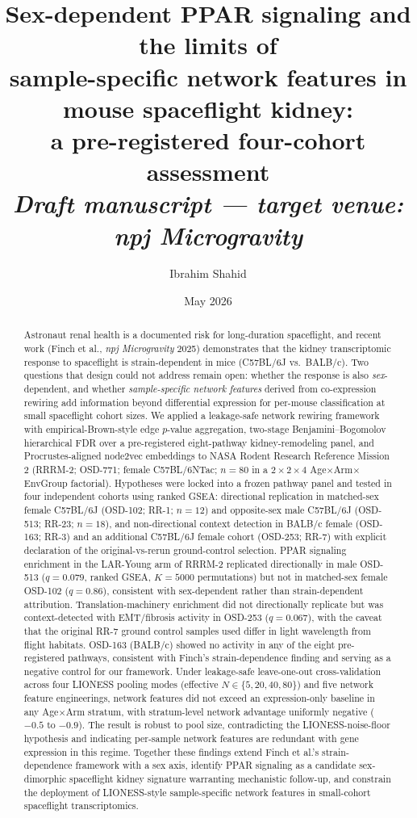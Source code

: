 \documentclass[11pt]{article}
\title{\textbf{Sex-dependent PPAR signaling and the limits of \\
sample-specific network features in mouse spaceflight kidney: \\
a pre-registered four-cohort assessment} \\[0.4em]
\large \textit{Draft manuscript --- target venue: \textnormal{npj Microgravity}}}
\author[1]{Ibrahim Shahid}
\author[1,*]{}
\affil[1]{Independent research; manuscript in preparation}
\affil[*]{Senior author placeholder pending PI involvement}
\date{May 2026}
\newcommand{\pkg}[1]{\textsf{#1}}
\begin{document}
\maketitle

\begin{abstract}
\noindent
Astronaut renal health is a documented risk for long-duration spaceflight, and recent work (Finch et al., \emph{npj Microgravity} 2025) demonstrates that the kidney transcriptomic response to spaceflight is strain-dependent in mice (C57BL/6J vs.\ BALB/c). Two questions that design could not address remain open: whether the response is also \emph{sex}-dependent, and whether \emph{sample-specific network features} derived from co-expression rewiring add information beyond differential expression for per-mouse classification at small spaceflight cohort sizes. We applied a leakage-safe network rewiring framework with empirical-Brown-style edge $p$-value aggregation, two-stage Benjamini--Bogomolov hierarchical FDR over a pre-registered eight-pathway kidney-remodeling panel, and Procrustes-aligned \pkg{node2vec} embeddings to NASA Rodent Research Reference Mission 2 (RRRM-2; OSD-771; female C57BL/6NTac; $n{=}80$ in a $2{\times}2{\times}4$ Age$\times$Arm$\times$EnvGroup factorial). Hypotheses were locked into a frozen pathway panel and tested in four independent cohorts using ranked GSEA: directional replication in matched-sex female C57BL/6J (OSD-102; RR-1; $n{=}12$) and opposite-sex male C57BL/6J (OSD-513; RR-23; $n{=}18$), and non-directional context detection in BALB/c female (OSD-163; RR-3) and an additional C57BL/6J female cohort (OSD-253; RR-7) with explicit declaration of the original-vs-rerun ground-control selection. PPAR signaling enrichment in the LAR-Young arm of RRRM-2 replicated directionally in male OSD-513 ($q{=}0.079$, ranked GSEA, $K{=}5000$ permutations) but not in matched-sex female OSD-102 ($q{=}0.86$), consistent with sex-dependent rather than strain-dependent attribution. Translation-machinery enrichment did not directionally replicate but was context-detected with EMT/fibrosis activity in OSD-253 ($q{=}0.067$), with the caveat that the original RR-7 ground control samples used differ in light wavelength from flight habitats. OSD-163 (BALB/c) showed no activity in any of the eight pre-registered pathways, consistent with Finch's strain-dependence finding and serving as a negative control for our framework. Under leakage-safe leave-one-out cross-validation across four LIONESS pooling modes (effective $N\in\{5,20,40,80\}$) and five network feature engineerings, network features did not exceed an expression-only baseline in any Age$\times$Arm stratum, with stratum-level network advantage uniformly negative ($-0.5$ to $-0.9$). The result is robust to pool size, contradicting the LIONESS-noise-floor hypothesis and indicating per-sample network features are redundant with gene expression in this regime. Together these findings extend Finch et al.'s strain-dependence framework with a sex axis, identify PPAR signaling as a candidate sex-dimorphic spaceflight kidney signature warranting mechanistic follow-up, and constrain the deployment of LIONESS-style sample-specific network features in small-cohort spaceflight transcriptomics.

\end{abstract}
\end{document}
